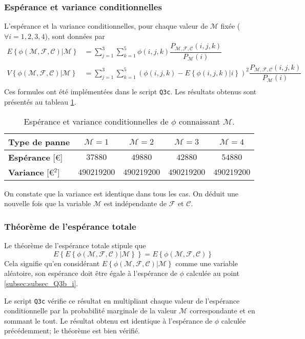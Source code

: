 \documentclass[a4paper, 12pt]{article}
\newcommand{\M}{\mathcal{M}}
\newcommand{\F}{\mathcal{F}}
\newcommand{\C}{\mathcal{C}}
\begin{document}
	\subsubsection{Espérance et variance conditionnelles}
	\label{subsec:subsec_Q3c_i}
	L'espérance et la variance conditionnelles, pour chaque valeur de \(\M\) fixée (\(\forall i = 1,2,3,4\)), sont données par
	\begin{align*}
	    E\left\{\phi\left(\M,\F,\C\right)|\M\right\} &= \sum_{j=1}^{3}\sum_{k=1}^{5}\phi\left(i,j,k\right)\dfrac{P_{\M, \F, \C}\left(i,j,k\right)}{P_\M\left(i\right)}\\
	    V\left\{\phi\left(\M, \F, \C\right)|\M\right\} &= \sum_{j=1}^{3}\sum_{k=1}^{5}\left(\phi\left(i, j, k\right) - E\left\{\phi\left(i,j,k\right)|i\right\}\right)^2\dfrac{P_{\M, \F, \C}\left(i, j, k\right)}{P_\M\left(i\right)}\\
	\end{align*}
	Ces formules ont été implémentées dans le script \texttt{Q3c}. Les résultats obtenus sont présentés au tableau \ref{tab:tab_Q3c}.\par
	\begin{table}[!ht]
	    \centering
	    \begin{tabular}{|l|c|c|c|c|}
	        \hline
	        \textbf{Type de panne} & \(\M = 1\) & \(\M = 2\) & \(\M = 3\) & \(\M = 4\)\\
	        \hline
	        \hline
	        \textbf{Espérance} [\euro{}] & \(\num{37880}\) & \(\num{49880}\) & \(\num{42880}\) & \(\num{54880}\)\\
	        \hline
	        \textbf{Variance} [\euro{}\(^2\)] & \(\num{490219200}\) & \(\num{490219200}\) & \(\num{490219200}\) & \(\num{490219200}\)\\
	        \hline
	    \end{tabular}
	    \caption{Espérance et variance conditionnelles de \(\phi\) connaissant \(\M\).}
	    \label{tab:tab_Q3c}
	\end{table}
	On constate que la variance est identique dans tous les cas. On déduit une nouvelle fois que la variable \(\M\) est indépendante de \(\F\) et \(\C\).
	\subsubsection{Théorème de l'espérance totale}
	Le théorème de l'espérance totale stipule que
	\begin{displaymath}
	    E\left\{E\left\{\phi\left(\M,\F,\C\right)|\M\right\}\right\} = E\left\{\phi\left(\M,\F,\C\right)\right\}
	\end{displaymath}
	Cela signifie qu'en considérant \(E\left\{\phi\left(\M,\F,\C\right)|\M\right\}\) comme une variable aléatoire, son espérance doit être égale à l'espérance de \(\phi\) calculée au point \ref{subsec:subsec_Q3b_i}.\par
	Le script \texttt{Q3c} vérifie ce résultat en multipliant chaque valeur de l'espérance conditionnelle par la probabilité marginale de la valeur \(\M\) correspondante et en sommant le tout. Le résultat obtenu est identique à l'espérance de \(\phi\) calculée précédemment; le théorème est bien vérifié.
\end{document}
